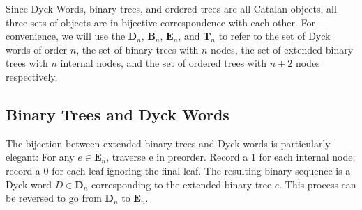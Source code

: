 Since Dyck Words, binary trees, and ordered trees are all Catalan objects, all three sets of objects are in bijective correspondence with each other.  For convenience, we will use the $\mathbf{D}_n$, $\mathbf{B}_n$, $\mathbf{E}_n$, and $\mathbf{T}_n$ to refer to the set of Dyck words of order $n$, the set of binary trees with $n$ nodes, the set of extended binary trees with $n$ internal nodes, and the set of ordered trees with $n+2$ nodes respectively.  

\subsection{Binary Trees and Dyck Words}

The bijection between extended binary trees and Dyck words is particularly elegant: 
For any $e \in \mathbf{E}_n$, traverse e in preorder.  Record a $1$ for each internal node; record a $0$ for each leaf ignoring the final leaf. The resulting binary sequence is a Dyck word  $D \in \mathbf{D}_n $ corresponding to the extended binary tree $e$.  This process can be reversed to go from $\mathbf{D}_n$ to $\mathbf{E}_n$.

